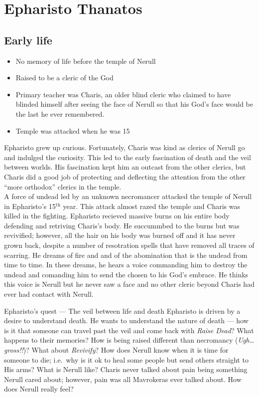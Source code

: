 \documentclass[10pt,twoside,twocolumn,openany]{book}
\begin{document}
\selectfont %


\chapter{Epharisto Thanatos}

\section{Early life}
\begin{itemize}
\item No memory of life before the temple of Nerull
\item Raised to be a cleric of the God
\item Primary teacher was Charis, an older blind cleric who claimed to have blinded himself after seeing the face of Nerull so that his God's face would be the last he ever remembered.
\item Temple was attacked when he was 15
\end{itemize}

Epharisto grew up curious. Fortunately, Charis was kind as clerics of Nerull go and indulged the curiosity.
This led to the early fascination of death and the veil between worlds.
His fascination kept him an outcast from the other clerics, but Charis did a good job of protecting and deflecting the attention from the other ``more orthodox'' clerics in the temple. \\

A force of undead led by an unknown necromancer attacked the temple of Nerull in Epharisto's 15$^\textrm{th}$ year.
This attack almost razed the temple and Charis was killed in the fighting.
Epharisto recieved massive burns on his entire body defending and retriving Charis's body.
He succummbed to the burns but was revivified; however, all the hair on his body was burned off and it has never grown back, despite a number of resotration spells that have removed all traces of scarring.
He dreams of fire and and of the abomination that is the undead from time to time.
In these dreams, he hears a voice commanding him to destroy the undead and comanding him to send the chosen to his God's embrace.
He thinks this voice is Nerull but he never saw a face and no other cleric beyond Charis had ever had contact with Nerull.
\begin{commentbox}{Epharisto's quest --- The veil between life and death}
  Epharisto is driven by a desire to understand death.
  He wants to understand the nature of death --- how is it that someone can travel past the veil and come back with \emph{Raise Dead}?
  What happens to their memories?
  How is being raised different than necromancy (\emph{Ugh\ldots gross!!})?
  What about \emph{Revivify}?
  How does Nerull know when it is time for someone to die; i.e.\ why is it ok to heal some people but send others straight to His arms?
  What is Nerull like?
  Charis never talked about pain being something Nerull cared about; however, pain was all Mavrokeras ever talked about.
  How does Nerull really feel?
\end{commentbox}
\end{document}
